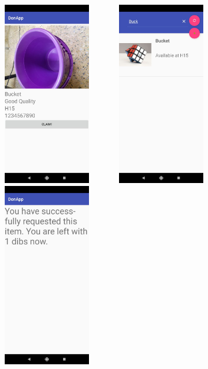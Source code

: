 \documentclass[12pt, a4paper]{article}
\begin{document}
\newline
\includegraphics[width=5cm, height=8cm]{bucket.jpeg}
\includegraphics[width=5cm, height=8cm]{search.jpeg}
\includegraphics[width=5cm, height=8cm]{dibs.jpeg}
\end{document}
